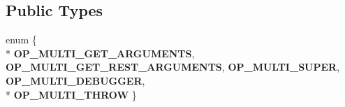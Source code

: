 \subsection*{Public Types}
\begin{DoxyCompactItemize}
\item 
enum \{ \\*
{\bfseries O\+P\+\_\+\+M\+U\+L\+T\+I\+\_\+\+G\+E\+T\+\_\+\+A\+R\+G\+U\+M\+E\+N\+TS}, 
{\bfseries O\+P\+\_\+\+M\+U\+L\+T\+I\+\_\+\+G\+E\+T\+\_\+\+R\+E\+S\+T\+\_\+\+A\+R\+G\+U\+M\+E\+N\+TS}, 
{\bfseries O\+P\+\_\+\+M\+U\+L\+T\+I\+\_\+\+S\+U\+P\+ER}, 
{\bfseries O\+P\+\_\+\+M\+U\+L\+T\+I\+\_\+\+D\+E\+B\+U\+G\+G\+ER}, 
\\*
{\bfseries O\+P\+\_\+\+M\+U\+L\+T\+I\+\_\+\+T\+H\+R\+OW}
 \}\hypertarget{class_object_script_1_1_o_s_1_1_core_abd11ac48a77473098209ac6aafb950b2}{}\label{class_object_script_1_1_o_s_1_1_core_abd11ac48a77473098209ac6aafb950b2}


\end{DoxyCompactItemize}
